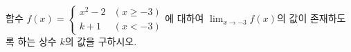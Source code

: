 함수 $f(x)=\begin{cases} x^2-2 & (x\ge -3) \\ k+1 & (x<-3) \end{cases}$에 대하여 $\displaystyle\lim_{x\to-3} f(x)$의 값이 존재하도록 하는 상수 $k$의 값을 구하시오.
